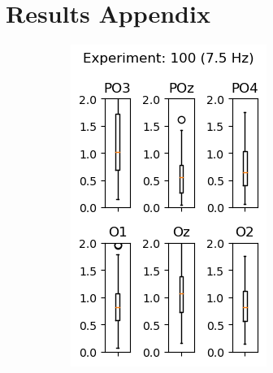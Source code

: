 \chapter{Results Appendix}
\label{app:R}

\begin{figure}[h]
    \centering
    \begin{subfigure}{0.3\textwidth}
        \includegraphics[width=\linewidth]{images/appendix/10075.png}
        \label{fig:10075}
    \end{subfigure}
    \hfill
    \begin{subfigure}{0.3\textwidth}

\end{subfigure}
\end{figure}
